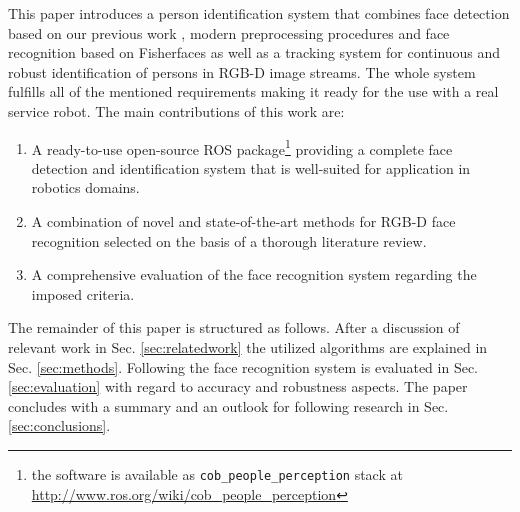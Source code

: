This paper introduces a person identification system that combines face detection based on our previous work \cite{Fischer2010}, modern preprocessing procedures and face recognition based on Fisherfaces \cite{Belhumeur1997} as well as a tracking system for continuous and robust identification of persons in RGB-D image streams. The whole system fulfills all of the mentioned requirements making it ready for the use with a real service robot. The main contributions of this work are:
\begin{enumerate}
	\item A ready-to-use open-source ROS package\footnote{the software is available as \texttt{cob\_people\_perception} stack at \url{http://www.ros.org/wiki/cob_people_perception}} providing a complete face detection and identification system that is well-suited for application in robotics domains.
	\item A combination of novel and state-of-the-art methods for RGB-D face recognition selected on the basis of a thorough literature review.
	\item A comprehensive evaluation of the face recognition system regarding the imposed criteria.
\end{enumerate}

The remainder of this paper is structured as follows. After a discussion of relevant work in Sec. \ref{sec:relatedwork} the utilized algorithms are explained in Sec. \ref{sec:methods}. Following the face recognition system is evaluated in Sec. \ref{sec:evaluation} with regard to accuracy and robustness aspects. The paper concludes with a summary and an outlook for following research in Sec. \ref{sec:conclusions}.

